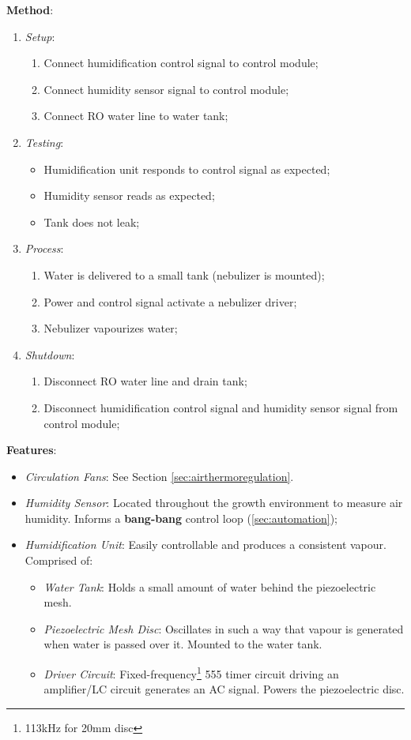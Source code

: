 \documentclass{../tex/report}
\begin{document}
\textbf{Method}:
\begin{enumerate}
    \item \textit{Setup}:
    \begin{enumerate}
        \item Connect humidification control signal to control module;
        \item Connect humidity sensor signal to control module;
        \item Connect RO water line to water tank;
    \end{enumerate}
    \item \textit{Testing}:
    \begin{itemize}
        \item Humidification unit responds to control signal as expected;
        \item Humidity sensor reads as expected;
        \item Tank does not leak;
    \end{itemize}
    \item \textit{Process}:
    \begin{enumerate}
        \item Water is delivered to a small tank (nebulizer is mounted);
        \item Power and control signal activate a nebulizer driver;
        \item Nebulizer vapourizes water;
    \end{enumerate}
    \item \textit{Shutdown}:
    \begin{enumerate}
        \item Disconnect RO water line and drain tank;
        \item Disconnect humidification control signal and humidity sensor signal from control module;
    \end{enumerate}
\end{enumerate}

\textbf{Features}:
\begin{itemize}
    \item \textit{Circulation Fans}: See Section \ref{sec:airthermoregulation}.
    \item \textit{Humidity Sensor}: Located throughout the growth environment to measure air humidity. Informs a \textbf{bang-bang} control loop (\ref{sec:automation});
    \item \textit{Humidification Unit}: Easily controllable and produces a consistent vapour. Comprised of:
    \begin{itemize}
        \item \textit{Water Tank}: Holds a small amount of water behind the piezoelectric mesh.
        \item \textit{Piezoelectric Mesh Disc}: Oscillates in such a way that vapour is generated when water is passed over it. Mounted to the water tank.
        \item \textit{Driver Circuit}: Fixed-frequency\footnote{113kHz for 20mm disc} 555 timer circuit driving an amplifier/LC circuit generates an AC signal. Powers the piezoelectric disc.
    \end{itemize}
\end{itemize}
\end{document}
